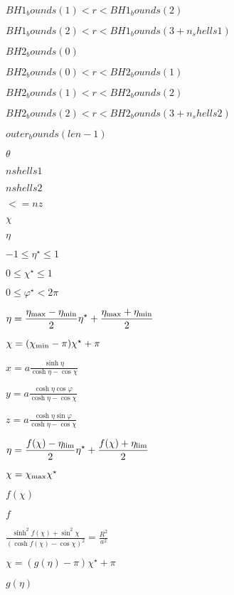 \documentclass{article}
\begin{document}
$ BH1_bounds(1) < r < BH1_bounds(2) $
\pagebreak

$ BH1_bounds(2) < r < BH1_bounds(3+n_shells1) $
\pagebreak

$ BH2_bounds(0) $
\pagebreak

$ BH2_bounds(0) < r < BH2_bounds(1) $
\pagebreak

$ BH2_bounds(1) < r < BH2_bounds(2) $
\pagebreak

$ BH2_bounds(2) < r < BH2_bounds(3+n_shells2) $
\pagebreak

$ outer_bounds(len-1) $
\pagebreak

$\theta$
\pagebreak

$ nshells1 $
\pagebreak

$ nshells2 $
\pagebreak

$ <= nz $
\pagebreak

$ \chi $
\pagebreak

$ \eta $
\pagebreak

$ -1 \leq \eta^\star \leq 1 $
\pagebreak

$ 0 \leq \chi^\star \leq 1 $
\pagebreak

$ 0 \leq \varphi^\star < 2\pi $
\pagebreak

$ \eta = \displaystyle\frac{\eta_{\rm max}-\eta_{\rm min}}{2} \eta^\star + \displaystyle\frac{\eta_{\rm max}+\eta_{\rm min}}{2} $
\pagebreak

$ \chi = (\chi_{\rm min}- \pi) \chi^\star + \pi $
\pagebreak

$ x = a \displaystyle\frac{\sinh \eta}{\cosh\eta - \cos\chi} $
\pagebreak

$ y = a \displaystyle\frac{\cosh \eta \cos\varphi}{\cosh\eta - \cos\chi} $
\pagebreak

$ z = a \displaystyle\frac{\cosh \eta \sin\varphi}{\cosh\eta - \cos\chi} $
\pagebreak

$ \eta = \displaystyle\frac{f(\chi)-\eta_{\rm lim}}{2} \eta^\star + \displaystyle\frac{f(\chi)+\eta_{\rm lim}}{2} $
\pagebreak

$ \chi = \chi_{\rm max} \chi^\star $
\pagebreak

$ f (\chi) $
\pagebreak

$ f $
\pagebreak

$ \displaystyle\frac{\sinh ^2 f(\chi) + \sin ^2\chi} {(\cosh f(\chi) - \cos \chi)^2} = \displaystyle\frac{R^2}{a^2} $
\pagebreak

$ \chi = (g(\eta)-\pi) \chi^\star + \pi $
\pagebreak

$ g (\eta) $
\pagebreak
\end{document}
